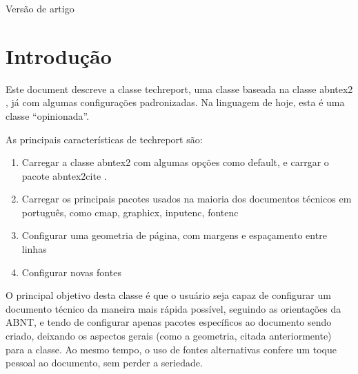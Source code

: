 \documentclass[article]{techreport}
\renewcommand{\imprimircapa}{%
  \begin{capa}%
    
    \center
    {\ABNTEXchapterfont\Large\imprimirinstituicao}
    
    \vspace*{\fill}
    {\ABNTEXchapterfont\bfseries\LARGE\imprimirtitulo}
    \par
    \par
    {\ABNTEXchapterfont\large Versão de artigo}
    \vspace*{\fill}

    \vspace*{\fill}
    {\ABNTEXchapterfont\large\imprimirautor}
    \vspace*{\fill}

    {\ABNTEXchapterfont\large\imprimirlocal}
    \par
    {\ABNTEXchapterfont\large\imprimirdata}

    \vspace*{1cm}

  \end{capa}
}
\newcommand{\trep}{\textsf{techreport}}
\begin{document}
\pretextual
\imprimircapa

%
%
\tableofcontents*

\textual


\section{Introdução}
\label{sec:introducao}

Este document descreve a classe \trep, uma classe baseada na classe \textsf{abntex2} \cite{bib:abntex2classe} , já com algumas configurações padronizadas. Na linguagem de hoje, esta é uma classe ``opinionada''.

As principais características de \trep{} são:

\begin{enumerate}
\item Carregar a classe \textsf{abntex2} com algumas opções como default, e carrgar o pacote \textsf{abntex2cite} \cite{abntex2cite}.
\item Carregar os principais pacotes usados na maioria dos documentos técnicos em português, como \textsf{cmap}, \textsf{graphicx}, \textsf{inputenc}, \textsf{fontenc}
\item Configurar uma geometria de página, com margens e espaçamento entre linhas
\item Configurar novas fontes
\end{enumerate}

O principal objetivo desta classe é que o usuário seja capaz de configurar um documento técnico da maneira mais rápida possível, seguindo as orientações da ABNT, e tendo de configurar apenas pacotes específicos ao documento sendo criado, deixando os aspectos gerais (como a geometria, citada anteriormente) para a classe. Ao mesmo tempo, o uso de fontes alternativas confere um toque pessoal ao documento, sem perder a seriedade.
\end{document}
